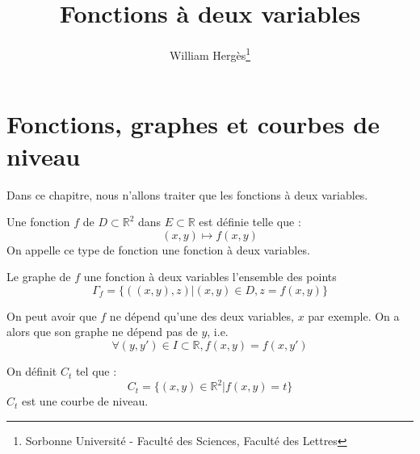 \documentclass[a4paper, titlepage]{article}
\title{Fonctions à deux variables}
\author{William Hergès\thanks{Sorbonne Université - Faculté des Sciences, Faculté des Lettres}}
\begin{document}
	\maketitle
	\tableofcontents
	\newpage
	\section{Fonctions, graphes et courbes de niveau}
	Dans ce chapitre, nous n'allons traiter que les fonctions à deux variables.
	\begin{defn}
		Une fonction $f$ de $D\subset\mathbb{R}^2$ dans $E\subset\mathbb{R}$ est définie telle que :
		$$(x,y)\longmapsto f(x,y)$$
		On appelle ce type de fonction une fonction à deux variables.
	\end{defn}
	\begin{defn}
		Le graphe de $f$ une fonction à deux variables l'ensemble des points
		$$ \Gamma_f = \{((x,y),z)|(x,y)\in D,z=f(x,y)\} $$
	\end{defn}
	On peut avoir que $f$ ne dépend qu'une des deux variables, $x$ par exemple. On a alors que son graphe ne dépend pas de $y$, i.e.
	$$ \forall (y,y')\in I\subset\mathbb{R}, f(x,y) = f(x,y') $$
	\begin{defn}
		On définit $C_t$ tel que :
		$$C_t = \{(x,y)\in\mathbb{R}^2|f(x,y)=t\}$$
		$C_t$ est une courbe de niveau.
	\end{defn}
\end{document}

